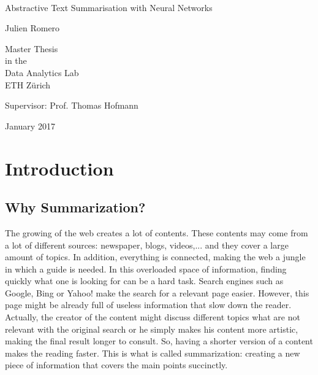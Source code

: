 \documentclass[11pt,a4paper,oldfontcommands]{memoir}
\begin{document}
%
%
\thispagestyle{empty}

{%
\sffamily
\centering
\Large

~\vspace{\fill}

{\huge 
Abstractive Text Summarisation with Neural Networks
}

\vspace{2.5cm}

{\LARGE
Julien Romero
}

\vspace{3.5cm}

Master Thesis\\[1em]
in the\\[1em]
Data Analytics Lab\\
ETH Zürich

\vspace{3.5cm}

Supervisor: Prof. Thomas Hofmann

\vspace{\fill}

January 2017

}%

\cleardoublepage

\tableofcontents*

\clearpage


\chapter{Introduction}

\section{Why Summarization?}

The growing of the web creates a lot of contents. These contents may come from a lot of different sources: newspaper, blogs, videos,... and they cover a large amount of topics. In addition, everything is connected, making the web a  jungle in which a guide is needed.
In this overloaded space of information, finding quickly what one is looking for can be a hard task. Search engines such as Google, Bing or Yahoo! make the search for a relevant page easier. However, this page might be already full of useless information that slow down the reader. Actually, the creator of the content might discuss different topics what are not relevant with the original search or he simply makes his content more artistic, making the final result longer to consult. So, having a shorter version of a content makes the reading faster. This is what is called summarization: creating a new piece of information that covers the main points succinctly.
\end{document}
